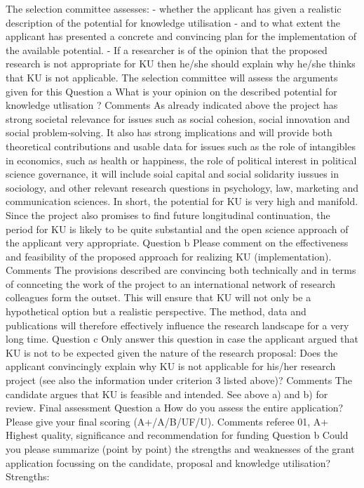 \documentclass[twocolumn, serif, rga, numeric]{jote-article}
\begin{document}
The selection committee assesses: - whether the applicant has given a realistic description of the potential for knowledge utilisation - and to what extent the applicant has presented a concrete and convincing plan for the implementation of the available potential. - If a researcher is of the opinion that the proposed research is not appropriate for KU then he/she should explain why he/she thinks that KU is not applicable. The selection committee will assess the arguments given for this
Question a
What is your opinion on the described potential for knowledge utlisation ?
Comments
As already indicated above the project has strong societal relevance for issues such as social cohesion, social innovation and social problem-solving. It also has strong implications and will provide both theoretical contributions and usable data for issues such as the role of intangibles in economics, such as health or happiness, the role of political interest in political science governance, it will include soial capital and social solidarity iussues in sociology, and other relevant research questions in psychology, law, marketing and communication sciences. In short, the potential for KU is very high and manifold.
Since the project also promises to find future longitudinal continuation, the period for KU is likely to be quite substantial and the open science approach of the applicant very appropriate.
Question b
Please comment on the effectiveness and feasibility of the proposed approach for realizing KU (implementation).
Comments
The provisions described are convincing both technically and in terms of connceting the work of the project to an international network of research colleagues form the outset. This will ensure that KU will not only be a hypothetical option but a realistic perspective. The method, data and publications will therefore effectively influence the research landscape for a very long time.
Question c
Only answer this question in case the applicant argued that KU is not to be expected given the nature of the research proposal: Does the applicant convincingly explain why KU is not applicable for his/her research project (see also the information under criterion 3 listed above)?
Comments
The candidate argues that KU is feasible and intended. See above a) and b) for review.
Final assessment
Question a
How do you assess the entire application? Please give your final scoring (A+/A/B/UF/U).
Comments referee 
01, A+ Highest quality, significance and recommendation for funding
Question b
Could you please summarize (point by point) the strengths and weaknesses of the grant application focussing on the candidate, proposal and knowledge utilisation? Strengths:
\end{document}
